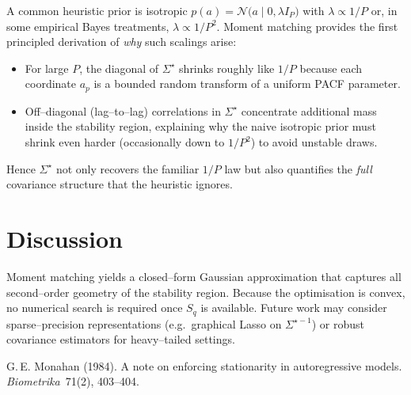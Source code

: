 \documentclass[11pt]{article}
\begin{document}
A common heuristic prior is isotropic
$p(a)=\mathcal N\!\bigl(a\mid0,\lambda I_P\bigr)$ with
$\lambda\propto 1/P$ or, in some empirical Bayes treatments,
$\lambda\propto 1/P^2$.  Moment matching provides the first principled
derivation of \emph{why} such scalings arise:

\begin{itemize}
  \item For large $P$, the diagonal of $\Sigma^\star$ shrinks roughly
        like $1/P$ because each coordinate $a_p$ is a bounded random
        transform of a uniform PACF parameter.
  \item Off--diagonal (lag--to--lag) correlations in $\Sigma^\star$
        concentrate additional mass inside the stability region,
        explaining why the naive isotropic prior must shrink even
        harder (occasionally down to $1/P^2$) to avoid unstable draws.
\end{itemize}
Hence $\Sigma^\star$ not only recovers the familiar $1/P$ law but also
quantifies the \emph{full} covariance structure that the heuristic
ignores.

\section{Discussion}

Moment matching yields a closed--form Gaussian approximation that
captures all second--order geometry of the stability region.  Because
the optimisation is convex, no numerical search is required once
$S_q$ is available.  Future work may consider sparse--precision
representations (e.g.\ graphical Lasso on $\Sigma^{\star-1}$) or robust
covariance estimators for heavy--tailed settings.

\begin{thebibliography}{9}\small
{}
G.\,E. Monahan (1984).\;
A note on enforcing stationarity in autoregressive models.\;
\emph{Biometrika}~71(2), 403--404.
\end{thebibliography}
\end{document}
